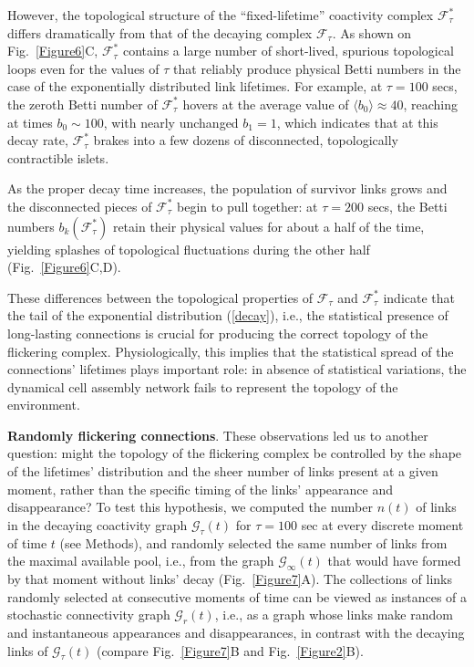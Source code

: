 \documentclass[12pt,tightenlines]{revtex4}
\begin{document}
However, the topological structure of the ``fixed-lifetime'' coactivity complex $\mathcal{F}^{*}_{\tau}$ differs dramatically 
from that of the decaying complex $\mathcal{F}_{\tau}$. As shown on Fig.~\ref{Figure6}C, $\mathcal{F}^{*}_{\tau}$ contains 
a large number of short-lived, spurious topological loops even for the values of $\tau$ that reliably produce physical Betti 
numbers in the case of the exponentially distributed link lifetimes. For example, at $\tau = 100$ secs, the zeroth Betti number 
of $\mathcal{F}^{*}_{\tau}$ hovers at the average value of $\langle b_0 \rangle \approx 40$, reaching at times $b_0 \sim100$, 
with nearly unchanged $b_1 = 1$, which indicates that at this decay rate, $\mathcal{F}^{*}_{\tau}$ brakes into a few dozens 
of disconnected, topologically contractible islets.

As the proper decay time increases, the population of survivor links grows and the disconnected pieces of 
$\mathcal{F}^{*}_{\tau}$ begin to pull together: at $\tau = 200$ secs, the Betti numbers $b_k(\mathcal{F}^{*}_{\tau})$ 
retain their  physical values for about a half of the time, yielding splashes of topological fluctuations during the other half 
(Fig.~\ref{Figure6}C,D). 

These differences between the topological properties of $\mathcal{F}_{\tau}$ and $\mathcal{F}^{*}_{\tau}$ indicate 
that the tail of the exponential distribution (\ref{decay}), i.e., the statistical presence of long-lasting connections is crucial 
for producing the correct topology of the flickering complex. Physiologically, this implies that the statistical spread of the 
connections' lifetimes plays important role: in absence of statistical variations, the dynamical cell assembly network fails 
to represent the topology of the environment.

\textbf{Randomly flickering connections}. These observations led us to another question: might the topology of the flickering 
complex be controlled by the shape of the lifetimes' distribution and the sheer number of links present at a given moment, 
rather than the specific timing of the links' appearance and disappearance? To test this hypothesis, we computed the number 
$n(t)$ of links in the decaying coactivity graph $\mathcal{G}_{\tau}(t)$ for $\tau = 100$ sec at every discrete moment of time 
$t$ (see Methods), and randomly selected the same number of links from the maximal available pool, i.e., from the graph 
$\mathcal{G}_{\infty}(t)$ that would have formed by that moment without links' decay (Fig.~\ref{Figure7}A). 
The collections of links randomly selected at consecutive moments of time can be viewed as instances of a stochastic 
connectivity graph $\mathcal{G}_{r}(t)$, i.e., as a graph whose links make random and instantaneous appearances and 
disappearances, in contrast with the decaying links of $\mathcal{G}_{\tau}(t)$ 
(compare Fig.~\ref{Figure7}B and Fig.~\ref{Figure2}B). %
\end{document}
